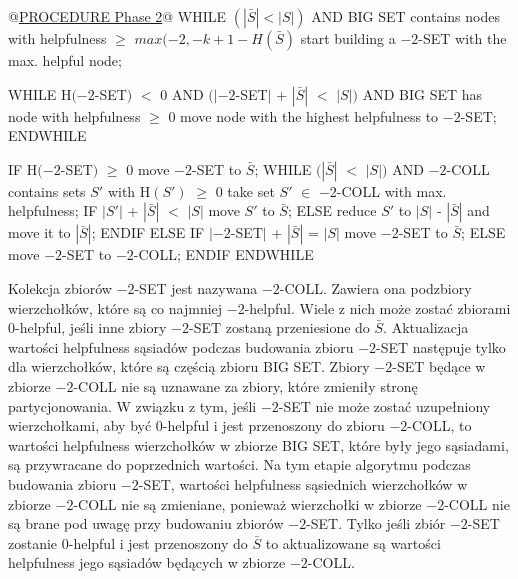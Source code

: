 \begin{pseudocode}
@\underline{PROCEDURE Phase 2}@
  WHILE $(|\bar{S}| < |S|)$ AND BIG SET contains nodes with helpfulness $\geq$ $max(-2, -k + 1 - H(\bar{S})$
    start building a $-2$-SET with the max. helpful node;

    WHILE H$(-2$-SET$)$ $<$ $0$ AND $(|-2$-SET$|$ + $|\bar{S}|$ $<$ $|S|)$ AND
          BIG SET has node with helpfulness $\geq$ $0$
      move node with the highest helpfulness to $-2$-SET;
    ENDWHILE

    IF H$(-2$-SET$)$ $\geq$ 0
      move $-2$-SET to $\bar{S}$;
      WHILE $(|\bar{S}|$ $<$ $|S|)$ AND $-2$-COLL contains sets $S'$ with H$(S')$ $\geq$ $0$
        take set $S'$ $\in$ $-2$-COLL with max. helpfulness;
        IF $|S'|$ + $|\bar{S}|$ $<$ $|S|$
          move $S'$ to $\bar{S}$;
        ELSE
          reduce $S'$ to $|S|$ - $|\bar{S}|$ and move it to $|\bar{S}|$;
        ENDIF
    ELSE IF $| -2$-SET$|$ + $|\bar{S}|$ = $|S|$
      move $-2$-SET to $\bar{S}$;
    ELSE
      move $-2$-SET to $-2$-COLL;
    ENDIF
  ENDWHILE
\end{pseudocode}
\vspace{-8mm}
\label{code:phase_2}
\vspace{4mm}
Kolekcja zbiorów $-2$-SET jest nazywana $-2$-COLL.
Zawiera ona podzbiory wierzchołków, które są co najmniej $-2$-helpful.
Wiele z nich może zostać zbiorami $0$-helpful, jeśli inne zbiory $-2$-SET zostaną przeniesione do $\bar{S}$.
Aktualizacja wartości helpfulness sąsiadów podczas budowania zbioru $-2$-SET następuje tylko dla wierzchołków,
które są częścią zbioru BIG SET.
Zbiory $-2$-SET będące w zbiorze $-2$-COLL nie są uznawane za zbiory, które zmieniły stronę partycjonowania.
W związku z tym, jeśli $-2$-SET nie może zostać uzupełniony wierzchołkami, aby być $0$-helpful i jest przenoszony
do zbioru $-2$-COLL, to wartości helpfulness wierzchołków w zbiorze BIG SET, które były jego sąsiadami, są przywracane
do poprzednich wartości.
Na tym etapie algorytmu podczas budowania zbioru $-2$-SET, wartości helpfulness sąsiednich wierzchołków w zbiorze
$-2$-COLL nie są zmieniane, ponieważ wierzchołki w zbiorze $-2$-COLL nie są brane pod uwagę przy budowaniu zbiorów
$-2$-SET.
Tylko jeśli zbiór $-2$-SET zostanie $0$-helpful i jest przenoszony do $\bar{S}$ to aktualizowane są wartości helpfulness
jego sąsiadów będących w zbiorze $-2$-COLL.

